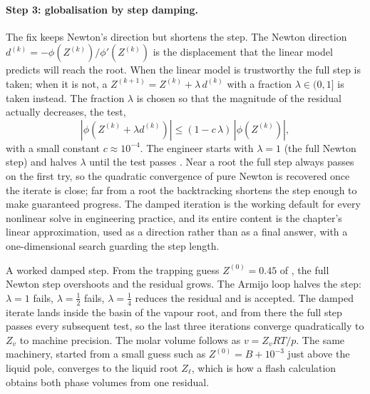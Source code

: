 \paragraph{Step 3: globalisation by step damping.}
The fix keeps Newton's direction but shortens the step. The Newton
direction $d^{(k)} = -\phi(Z^{(k)})/\phi'(Z^{(k)})$ is the displacement
that the linear model predicts will reach the root. When the linear
model is trustworthy the full step is taken; when it is not, a
 $Z^{(k+1)} = Z^{(k)} + \lambda\, d^{(k)}$ with a
fraction $\lambda \in (0, 1]$ is taken instead. The fraction $\lambda$
is chosen so that the magnitude of the residual actually decreases, the
 test,
\[
|\phi(Z^{(k)} + \lambda d^{(k)})| \leq (1 - c\,\lambda)\,|\phi(Z^{(k)})|,
\]
with a small constant $c \approx 10^{-4}$. The engineer starts with
$\lambda = 1$ (the full Newton step) and halves $\lambda$ until the test
passes \cite{text:v2ch05-nocedal-wright-numerical-optimisation-2006}.
Near a root the full step always passes on the first try, so the
quadratic convergence of pure Newton is recovered once the iterate is
close; far from a root the backtracking shortens the step enough to make
guaranteed progress. The damped iteration is the working default for
every nonlinear solve in engineering practice, and its entire content is
the chapter's linear approximation, used as a direction rather than as a
final answer, with a one-dimensional search guarding the step length.

A worked damped step. From the trapping guess $Z^{(0)} = 0.45$ of
, the full Newton step overshoots and
the residual grows. The Armijo loop halves the step: $\lambda = 1$
fails, $\lambda = \tfrac{1}{2}$ fails, $\lambda = \tfrac{1}{4}$
reduces the residual and is accepted. The damped iterate lands inside
the basin of the vapour root, and from there the full step passes every
subsequent test, so the last three iterations converge quadratically to
$Z_{v}$ to machine precision. The molar volume follows as
$v = Z_{v} R T / p$. The same machinery, started from a small guess such
as $Z^{(0)} = B + 10^{-3}$ just above the liquid pole, converges to the
liquid root $Z_{\ell}$, which is how a flash calculation obtains both
phase volumes from one residual.

